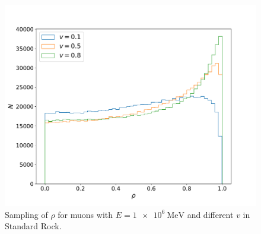 \documentclass[aspectratio=1610, captions=tableheading, 11pt]{beamer}
\begin{document}
\begin{frame}
\vspace{-3mm}

\begin{figure}
    \centering
    \includegraphics[height=0.9\textheight, trim=0.3cm 0.5cm 0.3cm 2cm,clip=true]{plots/plot_01.pdf}
    \caption{Sampling of $\rho$ for muons with $E = \SI{1e6}{\mega\electronvolt}$ and different $v$ in Standard Rock.}
    \label{fig:1}
\end{figure}

\end{frame}

\end{document}
